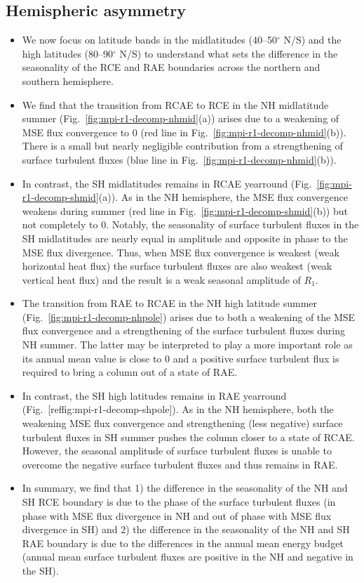\documentclass{ametsocV5}
\begin{document}
\subsection{Hemispheric asymmetry}
\begin{itemize}
  \item We now focus on latitude bands in the midlatitudes (40--50$^{\circ}$ N/S) and the high latitudes (80--90$^{\circ}$ N/S) to understand what sets the difference in the seasonality of the RCE and RAE boundaries across the northern and southern hemisphere.
  \item We find that the transition from RCAE to RCE in the NH midlatitude summer (Fig.~\ref{fig:mpi-r1-decomp-nhmid}(a)) arises due to a weakening of MSE flux convergence to 0 (red line in Fig.~\ref{fig:mpi-r1-decomp-nhmid}(b)). There is a small but nearly negligible contribution from a strengthening of surface turbulent fluxes (blue line in Fig.~\ref{fig:mpi-r1-decomp-nhmid}(b)).
  \item In contrast, the SH midlatitudes remains in RCAE yearround (Fig.~\ref{fig:mpi-r1-decomp-shmid}(a)). As in the NH hemisphere, the MSE flux convergence weakens during summer (red line in Fig.~\ref{fig:mpi-r1-decomp-shmid}(b)) but not completely to 0. Notably, the seasonality of surface turbulent fluxes in the SH midlatitudes are nearly equal in amplitude and opposite in phase to the MSE flux divergence. Thus, when MSE flux convergence is weakest (weak horizontal heat flux) the surface turbulent fluxes are also weakest (weak vertical heat flux) and the result is a weak seasonal amplitude of \(R_{1}\).
  \item The transition from RAE to RCAE in the NH high latitude summer (Fig.~\ref{fig:mpi-r1-decomp-nhpole}) arises due to both a weakening of the MSE flux convergence and a strengthening of the surface turbulent fluxes during NH summer. The latter may be interpreted to play a more important role as its annual mean value is close to 0 and a positive surface turbulent flux is required to bring a column out of a state of RAE.
  \item In contrast, the SH high latitudes remains in RAE yearround (Fig.~[ref{fig:mpi-r1-decomp-shpole}]). As in the NH hemisphere, both the weakening MSE flux convergence and strengthening (less negative) surface turbulent fluxes in SH summer pushes the column closer to a state of RCAE. However, the seasonal amplitude of surface turbulent fluxes is unable to overcome the negative surface turbulent fluxes and thus remains in RAE.
  \item In summary, we find that 1) the difference in the seasonality of the NH and SH RCE boundary is due to the phase of the surface turbulent fluxes (in phase with MSE flux divergence in NH and out of phase with MSE flux divergence in SH) and 2) the difference in the seasonality of the NH and SH RAE boundary is due to the differences in the annual mean energy budget (annual mean surface turbulent fluxes are positive in the NH and negative in the SH).
\end{itemize}
\end{document}
